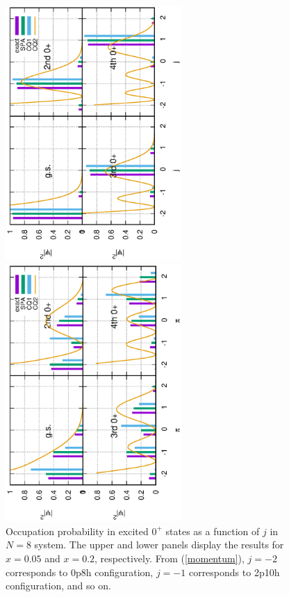 \documentclass[%
superscriptaddress,
preprint,
showpacs,
nofootinbib,
amsmath,amssymb,
prc,
floatfix ]%
{revtex4-1}
\begin{document}
\begin{figure}[htbp]
 \begin{minipage}{1\hsize}
 \begin{center}
  \includegraphics[width=67mm,angle=-90]{images/N8Xeq0p5occ.eps}
 \end{center}
 \end{minipage}
 \begin{minipage}{1\hsize}
 \begin{center}
  \includegraphics[width=67mm,angle=-90]{images/N8Xeq2occ.eps}
 \end{center}
 \end{minipage}
 \caption{Occupation probability in excited $0^+$ states as a function of $j$ in $N=8$ system. The upper and lower panels display the results for $x=0.05$ and $x=0.2$, respectively. From (\ref{momentum}), $j=-2$ corresponds to 0p8h configuration, $j=-1$ corresponds to 2p10h configuration, and so on.}
 \label{fig:N8_occ}
\end{figure}
\end{document}
